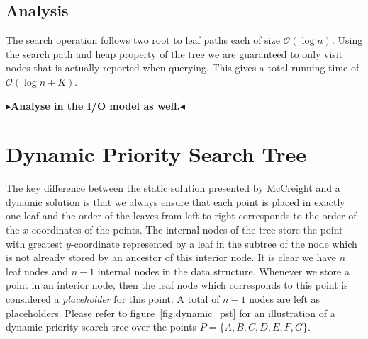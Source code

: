 \documentclass[twoside,11pt,openright]{report}
\newcommand{\todo}[1]{{\color[rgb]{.5,0,0}\textbf{$\blacktriangleright$#1$\blacktriangleleft$}}}
\begin{document}
\subsection{Analysis}
The search operation follows two root to leaf paths each of size $\mathcal{O}(\log n)$. Using the search path and heap property of the tree we are guaranteed to only visit nodes that is actually reported when querying. This gives a total running time of $\mathcal{O}(\log n + K)$.

\todo{Analyse in the I/O model as well.}

\section{Dynamic Priority Search Tree}
The key difference between the static solution presented by McCreight and a dynamic solution is that we always ensure that each point is placed in exactly one leaf and the order of the leaves from left to right corresponds to the order of the $x$-coordinates of the points. The internal nodes of the tree store the point with greatest $y$-coordinate represented by a leaf in the subtree of the node which is not already stored by an ancestor of this interior node. It is clear we have $n$ leaf nodes and $n-1$ internal nodes in the data structure.
Whenever we store a point in an interior node, then the leaf node which corresponds to this point is considered a \textit{placeholder} for this point. A total of $n - 1$ nodes are left as placeholders. Please refer to figure~\ref{fig:dynamic_pst} for an illustration of a dynamic priority search tree over the points $P = \{A, B, C, D, E, F, G \}$.
\end{document}

